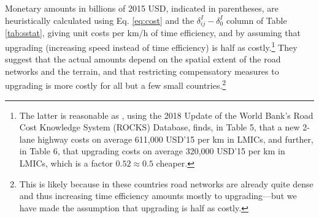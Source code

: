 \documentclass[a4paper]{article}
\begin{document}
Monetary amounts in billions of 2015 USD, indicated in parentheses, are heuristically calculated using Eq. \ref{eq:cost} and the $\delta^I_{ij}-\delta^I_0$ column of Table \ref{tab:sstat}, giving unit costs per km/h of time efficiency, and by assuming that upgrading (increasing speed instead of time efficiency) is half as costly.\footnote{The latter is reasonable as \citet{krantz2024optimal}, using the 2018 Update of the World Bank's Road Cost Knowledge System (ROCKS) Database, finds, in Table 5, that a new 2-lane highway costs on average 611,000 USD'15 per km in LMICs, and further, in Table 6, that upgrading costs on average 320,000 USD'15 per km in LMICs, which is a factor $0.52\approx 0.5$ cheaper.} They suggest that the actual amounts depend on the spatial extent of the road networks and the terrain, and that restricting compensatory measures to upgrading is more costly for all but a few small countries.\footnote{This is likely because in these countries road networks are already quite dense and thus increasing time efficiency amounts mostly to upgrading---but we have made the assumption that upgrading is half as costly.} \newline 
\end{document}
